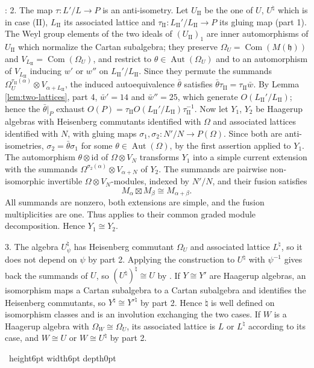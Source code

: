 \documentclass[leqno]{article}
\newcommand{\qed}{\hfill \vrule height6pt  width6pt depth0pt}
\newcommand{\co}{\colon}
\newcommand{\ot}{\otimes}
\newenvironment{proof}[1][]{\noindent {\it Proof #1} : }{\hbox{~}\qed
\smallskip
}
\numberwithin{equation}{section}
\begin{document}
\begin{proof}
2. The map $\tau \co L'/L \to P$ is an anti-isometry. Let $U_{\mathrm{II}}$ be the one of $U$, $U^\natural$ which is in case (II), $L_{\mathrm{II}}$ its associated lattice and $\tau_{\mathrm{II}} \co L_{\mathrm{II}}'/L_{\mathrm{II}} \to P$ its gluing map (part 1). The Weyl group elements of the two ideals of $(U_{\mathrm{II}})_1$ are inner automorphisms of $U_{\mathrm{II}}$ which normalize the Cartan subalgebra; they preserve $\Omega_U = \operatorname{Com}(M(\mathfrak h))$ and $V_{L_{\mathrm{II}}} = \operatorname{Com}(\Omega_U)$, and restrict to $\theta \in \operatorname{Aut}(\Omega_U)$ and to an automorphism of $V_{L_{\mathrm{II}}}$ inducing $w'$ or $w''$ on $L_{\mathrm{II}}'/L_{\mathrm{II}}$. Since they permute the summands $\Omega_U^{\tau_{\mathrm{II}}(\alpha)} \ot V_{\alpha+L_{\mathrm{II}}}$, the induced autoequivalence $\bar\theta$ satisfies $\bar\theta\tau_{\mathrm{II}} = \tau_{\mathrm{II}}\bar w$. By Lemma \ref{lem:two-lattices}, part 4, $\bar w' = 14$ and $\bar w'' = 25$, which generate $O(L_{\mathrm{II}}'/L_{\mathrm{II}})$; hence the $\bar\theta|_P$ exhaust $O(P) = \tau_{\mathrm{II}}O(L_{\mathrm{II}}'/L_{\mathrm{II}})\tau_{\mathrm{II}}^{-1}$. Now let $Y_1$, $Y_2$ be Haagerup algebras with Heisenberg commutants identified with $\Omega$ and associated lattices identified with $N$, with gluing maps $\sigma_1,\sigma_2 \co N'/N \to P(\Omega)$. Since both are anti-isometries, $\sigma_2 = \bar\theta\sigma_1$ for some $\theta \in \operatorname{Aut}(\Omega)$, by the first assertion applied to $Y_1$. The automorphism $\theta \ot \mathrm{id}$ of $\Omega \ot V_N$ transforms $Y_1$ into a simple current extension with the summands $\Omega^{\sigma_2(\alpha)} \ot V_{\alpha+N}$ of $Y_2$. The summands are pairwise non-isomorphic invertible $\Omega \ot V_N$-modules, indexed by $N'/N$, and their fusion satisfies
\[
M_\alpha \boxtimes M_\beta \cong M_{\alpha+\beta}.
\]
All summands are nonzero, both extensions are simple, and the fusion multiplicities are one. Thus \cite[Proposition 5.3]{DoM04} applies to their common graded module decomposition. Hence $Y_1 \cong Y_2$.

3. The algebra $U^\natural_\psi$ has Heisenberg commutant $\Omega_U$ and associated lattice $L^\natural$, so it does not depend on $\psi$ by part 2. Applying the construction to $U^\natural$ with $\psi^{-1}$ gives back the summands of $U$, so $(U^\natural)^\natural \cong U$ by \cite[Proposition 5.3]{DoM04}. If $Y \cong Y'$ are Haagerup algebras, an isomorphism maps a Cartan subalgebra to a Cartan subalgebra and identifies the Heisenberg commutants, so $Y^\natural \cong Y'^\natural$ by part 2. Hence $\natural$ is well defined on isomorphism classes and is an involution exchanging the two cases. If $W$ is a Haagerup algebra with $\Omega_W \cong \Omega_U$, its associated lattice is $L$ or $L^\natural$ according to its case, and $W \cong U$ or $W \cong U^\natural$ by part 2.


\end{proof}
\end{document}
